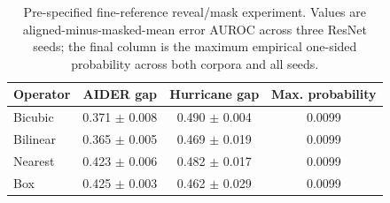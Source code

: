 \begin{table}[t]
\centering
\caption{Pre-specified fine-reference reveal/mask experiment. Values are aligned-minus-masked-mean error AUROC across three ResNet seeds; the final column is the maximum empirical one-sided probability across both corpora and all seeds.}
\label{tab:reveal-mask}
\begin{tabular}{lccc}
\toprule
Operator & AIDER gap & Hurricane gap & Max. probability \\
\midrule
Bicubic & 0.371 $\pm$ 0.008 & 0.490 $\pm$ 0.004 & 0.0099 \\
Bilinear & 0.365 $\pm$ 0.005 & 0.469 $\pm$ 0.019 & 0.0099 \\
Nearest & 0.423 $\pm$ 0.006 & 0.482 $\pm$ 0.017 & 0.0099 \\
Box & 0.425 $\pm$ 0.003 & 0.462 $\pm$ 0.029 & 0.0099 \\
\bottomrule
\end{tabular}
\end{table}
